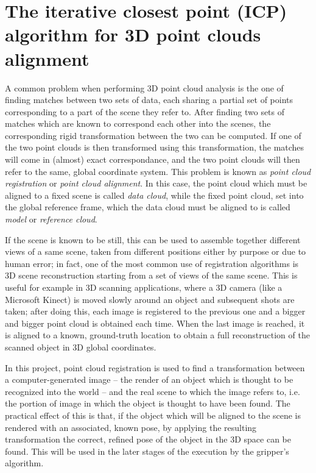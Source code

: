 \section{The iterative closest point (ICP) algorithm for 3D point clouds
alignment} \label{sec:icp}

A common problem when performing 3D point cloud analysis is the one of finding
matches between two sets of data, each sharing a partial set of points
corresponding to a part of the scene they refer to. After finding two sets of
matches which are known to correspond each other into the scenes, the
corresponding rigid transformation between the two can be computed. If one of the two
point clouds is then transformed using this transformation, the matches will
come in (almost) exact correspondance, and the two point clouds will then refer
to the same, global coordinate system. This problem is known as
\emph{point cloud registration} or \emph{point cloud alignment}. In this case,
the point cloud which must be aligned to a fixed scene is called \emph{data
cloud}, while the fixed point cloud, set into the global reference frame, 
which the data cloud must be aligned to is called \emph{model} or
\emph{reference cloud}.

If the scene is known to be still, this can be used to assemble together
different views of a same scene,
taken from different positions either by purpose or due to human error; in
fact, one of the most common use of registration algorithms is 3D scene
reconstruction starting from a set of views of the same scene. This is useful
for example in 3D scanning applications, where a 3D camera (like a Microsoft
Kinect) is moved slowly around an object and subsequent shots are taken;
after doing this, each image is registered to the previous one and a
bigger and bigger point cloud is obtained each time. When the last image is
reached, it is aligned to a known, ground-truth location to obtain a full
reconstruction of the scanned object in 3D global coordinates.

In this project, point cloud registration is used to find a transformation
between a computer-generated image -- the render of an object which is thought
to be recognized into the world -- and the real scene to which the image refers
to, i.e. the portion of image in which the object is thought to have been
found. The practical effect of this is that, if the object which will be
aligned to the scene is rendered with an associated, known pose, by applying
the resulting transformation the correct, refined pose of the object in the 3D
space can be found. This will be used in the later stages of the execution by
the gripper's algorithm.

